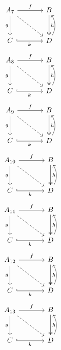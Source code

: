 \documentclass{article}
\begin{document}
\begin{equation}\begin{tikzcd}[column sep=large,row sep=large]
A_{7} \arrow[r,"f"] \arrow[d,"g"'] \arrow[dr,dashed] & B \arrow[d,two heads,"h"] \\ C \arrow[r,"k"',hook] & D \arrow[u,bend right]
\end{tikzcd}\end{equation}
\begin{equation}\begin{tikzcd}[column sep=large,row sep=large]
A_{8} \arrow[r,"f"] \arrow[d,"g"'] \arrow[dr,dashed] & B \arrow[d,two heads,"h"] \\ C \arrow[r,"k"',hook] & D \arrow[u,bend right]
\end{tikzcd}\end{equation}
\begin{equation}\begin{tikzcd}[column sep=large,row sep=large]
A_{9} \arrow[r,"f"] \arrow[d,"g"'] \arrow[dr,dashed] & B \arrow[d,two heads,"h"] \\ C \arrow[r,"k"',hook] & D \arrow[u,bend right]
\end{tikzcd}\end{equation}
\begin{equation}\begin{tikzcd}[column sep=large,row sep=large]
A_{10} \arrow[r,"f"] \arrow[d,"g"'] \arrow[dr,dashed] & B \arrow[d,two heads,"h"] \\ C \arrow[r,"k"',hook] & D \arrow[u,bend right]
\end{tikzcd}\end{equation}
\begin{equation}\begin{tikzcd}[column sep=large,row sep=large]
A_{11} \arrow[r,"f"] \arrow[d,"g"'] \arrow[dr,dashed] & B \arrow[d,two heads,"h"] \\ C \arrow[r,"k"',hook] & D \arrow[u,bend right]
\end{tikzcd}\end{equation}
\begin{equation}\begin{tikzcd}[column sep=large,row sep=large]
A_{12} \arrow[r,"f"] \arrow[d,"g"'] \arrow[dr,dashed] & B \arrow[d,two heads,"h"] \\ C \arrow[r,"k"',hook] & D \arrow[u,bend right]
\end{tikzcd}\end{equation}
\begin{equation}\begin{tikzcd}[column sep=large,row sep=large]
A_{13} \arrow[r,"f"] \arrow[d,"g"'] \arrow[dr,dashed] & B \arrow[d,two heads,"h"] \\ C \arrow[r,"k"',hook] & D \arrow[u,bend right]
\end{tikzcd}\end{equation}
\end{document}
